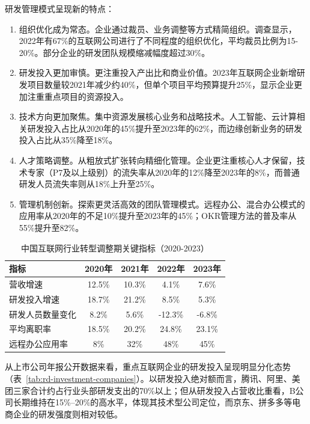研发管理模式呈现新的特点：
\begin{enumerate}
  \item 组织优化成为常态。企业通过裁员、业务调整等方式精简组织。调查显示，2022年有67\%的互联网公司进行了不同程度的组织优化，平均裁员比例为15-20\%。部分企业的研发团队规模缩减幅度超过30\%\cite{mckinsey2023tech}。
  \item 研发投入更加审慎。更注重投入产出比和商业价值。2023年互联网企业新增研发项目数量较2021年减少约40\%，但单个项目平均预算提升25\%，显示企业更加注重重点项目的资源投入\cite{china100internet2023}。
  \item 技术方向更加聚焦。集中资源发展核心业务和战略技术。人工智能、云计算相关研发投入占比从2020年的45\%提升至2023年的62\%，而边缘创新业务的研发投入占比从35\%降至18\%\cite{idc2023agile}。
  \item 人才策略调整。从粗放式扩张转向精细化管理。企业更注重核心人才保留，技术专家（P7及以上级别）的流失率从2020年的12\%降至2023年的8\%，而普通研发人员流失率则从18\%上升至25\%\cite{zhaopin2024tech}。
  \item 管理机制创新。探索更灵活高效的团队管理模式。远程办公、混合办公模式的应用率从2020年的不足10\%提升至2023年的45\%；OKR管理方法的普及率从55\%提升至82\%\cite{mckinsey2023tech}。
\end{enumerate}

\begin{table}[htbp]
\centering
\caption{中国互联网行业转型调整期关键指标（2020-2023）}
\label{tab:transformation-stage-metrics}
\begin{tabular}{lcccc}
\toprule
\textbf{指标} & \textbf{2020年} & \textbf{2021年} & \textbf{2022年} & \textbf{2023年} \\
\midrule
营收增速 & 12.5\% & 10.3\% & 4.1\% & 7.6\% \\
研发投入增速 & 18.7\% & 21.2\% & 8.5\% & 5.3\% \\
研发人员数量变化 & 8.2\% & 5.6\% & -12.3\% & -6.8\% \\
平均离职率 & 18.5\% & 20.2\% & 24.8\% & 23.1\% \\
远程办公应用率 & 8\% & 32\% & 48\% & 45\% \\
\bottomrule
\end{tabular}
\end{table}

从上市公司年报公开数据来看，重点互联网企业的研发投入呈现明显分化态势（表~\ref{tab:rd-investment-companies}）。以研发投入绝对额而言，腾讯、阿里、美团三家合计约占行业头部研发支出的70\%以上；但从研发投入占营收比重看，B公司长期维持在15\%--20\%的高水平，体现其技术型公司定位，而京东、拼多多等电商企业的研发强度则相对较低。

